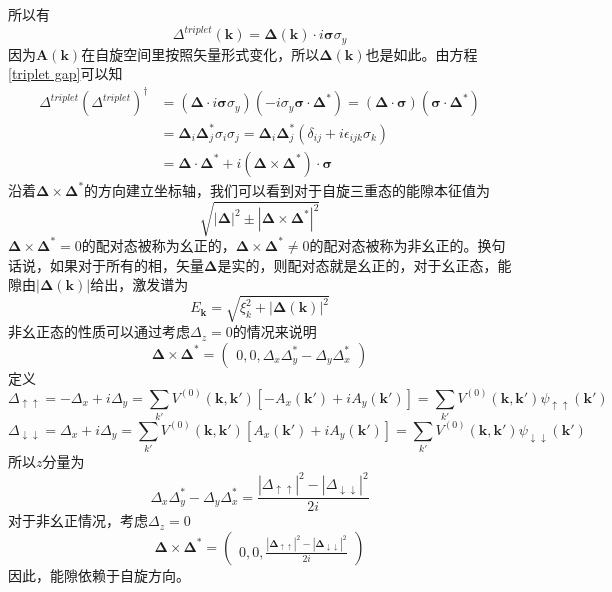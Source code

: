 \documentclass{article}
\numberwithin{equation}{subsection}
\newcommand{\mk}{\mathbf{k}}
\newcommand{\msigma}{\bm{\sigma}}
\newcommand{\mDelta}{\bm{\Delta}}
\begin{document}
所以有
\begin{equation}\label{triplet gap}
    \Delta^{triplet}(\mk)=\mDelta(\mk)\cdot i\msigma\sigma_y
\end{equation}
因为$\mathbf{A}(\mk)$在自旋空间里按照矢量形式变化，所以$\mDelta(\mk)$也是如此。由方程\eqref{triplet gap}可以知
\begin{equation}
    \begin{split}
        \Delta^{triplet}(\Delta^{triplet})^\dagger&=(\mDelta\cdot i\msigma\sigma_y)(-i\sigma_y\msigma\cdot\mDelta^*)=(\mDelta\cdot\msigma)(\msigma\cdot\mDelta^*)\\
        &=\mDelta_i\mDelta_j^*\sigma_i\sigma_j=\mDelta_i\mDelta_j^*(\delta_{ij}+i\epsilon_{ijk}\sigma_k)\\
        &=\mDelta\cdot\mDelta^*+i(\mDelta\times\mDelta^*)\cdot\msigma
    \end{split}
\end{equation}
沿着$\mDelta\times\mDelta^*$的方向建立坐标轴，我们可以看到对于自旋三重态的能隙本征值为
\begin{equation}
    \sqrt{|\mDelta|^2\pm|\mDelta\times\mDelta^*|^2}
\end{equation}
$\mDelta\times\mDelta^*=0$的配对态被称为幺正的，$\mDelta\times\mDelta^*\neq0$的配对态被称为非幺正的。换句话说，如果对于所有的相，矢量$\mDelta$是实的，则配对态就是幺正的，对于幺正态，能隙由$|\mDelta(\mk)|$给出，激发谱为
\begin{equation}
    E_{\mk}=\sqrt{\xi_k^2+|\mDelta(\mk)|^2}
\end{equation}
非幺正态的性质可以通过考虑$\Delta_z=0$的情况来说明
\begin{equation}
    \mDelta\times\mDelta^*=\begin{pmatrix}
        0,0,\Delta_x\Delta_y^*-\Delta_y\Delta_x^*
    \end{pmatrix}
\end{equation}
定义
\begin{equation}
    \Delta_{\uparrow\uparrow}=-\Delta_x+i\Delta_y=\sum_{k'}V^{(0)}(\mk,\mk')[-A_x(\mk')+iA_y(\mk')]=\sum_{k'}V^{(0)}(\mk,\mk')\psi_{\uparrow\uparrow}(\mk')
\end{equation}
\begin{equation}
    \Delta_{\downarrow\downarrow}=\Delta_x+i\Delta_y=\sum_{k'}V^{(0)}(\mk,\mk')[A_x(\mk')+iA_y(\mk')]=\sum_{k'}V^{(0)}(\mk,\mk')\psi_{\downarrow\downarrow}(\mk')
\end{equation}
所以$z$分量为
\begin{equation}
    \Delta_x\Delta_y^*-\Delta_y\Delta_x^*=\frac{|\Delta_{\uparrow\uparrow}|^2-|\Delta_{\downarrow\downarrow}|^2}{2i}
\end{equation}
对于非幺正情况，考虑$\Delta_z=0$
\begin{equation}
    \mDelta\times\mDelta^*=\begin{pmatrix}
        0,0,\frac{|\mDelta_{\uparrow\uparrow}|^2-|\mDelta_{\downarrow\downarrow}|^2}{2i}
    \end{pmatrix}
\end{equation}
因此，能隙依赖于自旋方向。
\end{document}
